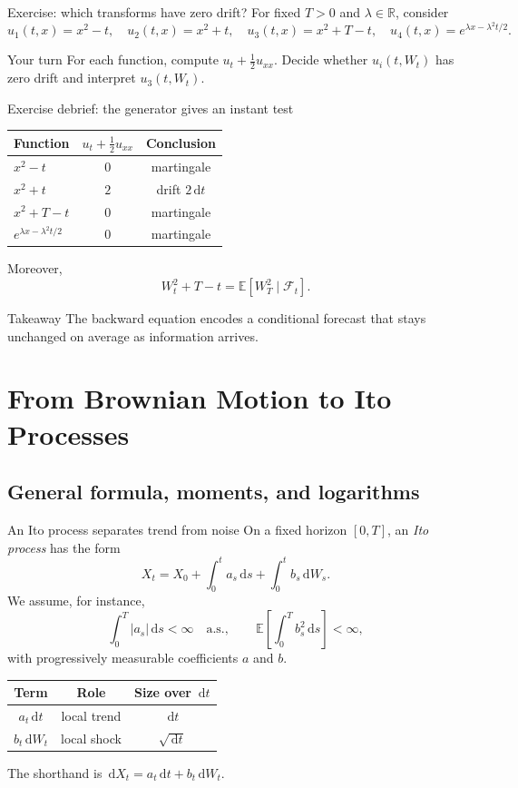 \documentclass[handout,10pt,aspectratio=169]{beamer}
\newcommand{\E}{\mathbb E}
\newcommand{\F}{\mathcal F}
\newcommand{\R}{\mathbb R}
\newcommand{\dd}{\,\mathrm d}
\begin{document}
\begin{frame}{Exercise: which transforms have zero drift?}
For fixed \(T>0\) and \(\lambda\in\R\), consider
\[
u_1(t,x)=x^2-t,
\quad
u_2(t,x)=x^2+t,
\quad
u_3(t,x)=x^2+T-t,
\quad
u_4(t,x)=e^{\lambda x-\lambda^2t/2}.
\]
\begin{block}{Your turn}
For each function, compute \(u_t+\frac12u_{xx}\). Decide whether \(u_i(t,W_t)\) has zero drift and interpret \(u_3(t,W_t)\).
\end{block}
\end{frame}

\begin{frame}{Exercise debrief: the generator gives an instant test}
\begin{center}
\begin{tabular}{lcc}
\toprule
Function & \(u_t+\frac12u_{xx}\) & Conclusion \\
\midrule
\(x^2-t\) & \(0\) & martingale \\
\(x^2+t\) & \(2\) & drift \(2\dd t\) \\
\(x^2+T-t\) & \(0\) & martingale \\
\(e^{\lambda x-\lambda^2t/2}\) & \(0\) & martingale \\
\bottomrule
\end{tabular}
\end{center}
Moreover,
\[
W_t^2+T-t=\E[W_T^2\mid\F_t].
\]
\begin{block}{Takeaway}
The backward equation encodes a conditional forecast that stays unchanged on average as information arrives.
\end{block}
\end{frame}

\section{From Brownian Motion to Ito Processes}
\subsection{General formula, moments, and logarithms}

\begin{frame}{An Ito process separates trend from noise}
On a fixed horizon \([0,T]\), an \emph{Ito process} has the form
\[
X_t=X_0+\int_0^t a_s\dd s+\int_0^t b_s\dd W_s.
\]
We assume, for instance,
\[
\int_0^T|a_s|\dd s<\infty\quad\text{a.s.},
\qquad
\E\!\left[\int_0^T b_s^2\dd s\right]<\infty,
\]
with progressively measurable coefficients \(a\) and \(b\).
\begin{center}
\begin{tabular}{ccc}
\toprule
Term & Role & Size over \(\dd t\) \\
\midrule
\(a_t\dd t\) & local trend & \(\dd t\) \\
\(b_t\dd W_t\) & local shock & \(\sqrt{\dd t}\) \\
\bottomrule
\end{tabular}
\end{center}
The shorthand is \(\dd X_t=a_t\dd t+b_t\dd W_t\).
\end{frame}
\end{document}
